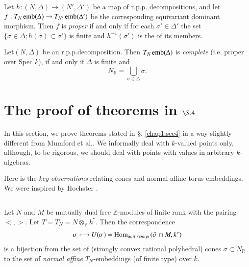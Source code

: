 \begin{theorem}\label{chap1:thm4.4} %
Let $h: (N,\Delta)\longrightarrow (N', \Delta')$ be a map of
r.p.p. decompositions, and let $f:T_N \operatorname{emb} (\Delta) \to T_{N'} \operatorname{emb}
(\Delta')$ be the corresponding equivariant dominant morphism. Then $f$ is
\textit{proper} if and only if for each $\sigma' \in \Delta'$ the set
$\Big\{ \sigma \in \Delta ; h (\sigma) \subset \sigma' \Big\}$ is
finite and $h^{-1}(\sigma')$ is the of its members.  
\end{theorem}

\setcounter{coro}{4}
\begin{coro}\label{chap1:coro4.5} %
Let\pageoriginale $(N, \Delta)$ be an r.p.p.decomposition. Then $T_N
\operatorname{emb} (\Delta)$ is \textit{complete} (i.e. proper over Spec $k$), if
and only if $\Delta$ is finite and   
$$
N_{\mathbb{R}} = \bigcup_{\sigma \in \Delta} \sigma.
$$
\end{coro}

\section{The proof of theorems in $\S.4$}\label{chap1:sec5}

	In this section, we prove theorems stated in \S. \ref{chap1:sec4} in a way
        slightly different from Mumford et al.\cite{keyTE}. We informally deal
        with $k$-valued points only, although, to be rigorous, we should
        deal with points with values in arbitrary $k$-algebras.  
	
	Here is the \textit{key observations} relating cones and
        normal affine torus embeddings. We were inspired by Hochster
        \cite{keyH5}.  
	
\subsection{}\label{chap1:subsec5.1}
 Let $N$ and $M$ be mutually dual free $\mathbb{Z}$-modules of finite
rank with the pairing $< , >$. Let $T = T_N = N \otimes_{\mathbb{Z}}
k^*$. Then the correspondence  
$$
\sigma \longmapsto U(\sigma) = \operatorname{Hom}_{unit.semigr} (\check{\sigma} 
\cap M, k^*) 
$$
is a bijection from the set of (strongly convex rational polyhedral)
cones $\sigma \subset N_{\mathbb{R}}$ to the set of \textit{normal
  affine} $T_N$-embeddings (of finite type) over $k$.  

